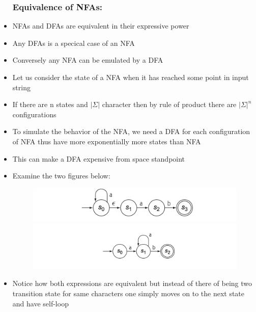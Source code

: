 \documentclass[20pt]{article}
\begin{document}
\begin{itemize}
                        \subsubsection*{Equivalence of  NFAs: }
                                  \item NFAs and DFAs are equivalent in their expressive power
                                  \item Any DFAs is a specical case of an NFA 
                                  \item Conversely any NFA can be emulated by a DFA
                                  \item Let us consider the state of a NFA when it has reached some point in input string
                                  \item If there are n states and $|\Sigma|$ character then by rule of product there are $|\Sigma|^n$ configurations
                                  \item To simulate the behavior of the NFA, we need a DFA for each configuration of NFA thus have more exponentially more states than NFA
                                  \item This can make a DFA expensive from space standpoint	
                                  \newpage	
                                  \item Examine the two figures below:		
                                  \begin{figure}[h]
                                    \includegraphics[width=\textwidth]{Images/combined.png}
                                    \includegraphics[width=\textwidth]{Images/nfaindfa.png}
                                  \end{figure}    
                                  \item Notice how both expressions are equivalent but instead of there of being two transition state for same characters
                                  one simply moves on to the next state and have self-loop
                        \end{itemize}
\end{document}
